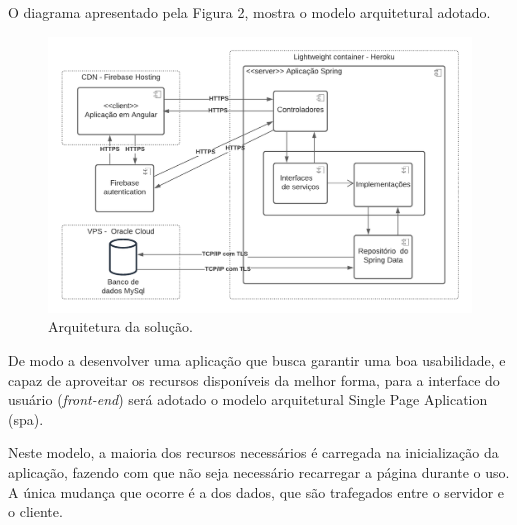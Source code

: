 \documentclass[
    12pt,               %
    openright,          %
    oneside,
    a4paper,            %
    paginasA3,  %
    english,            %
    brazil              %
    ]{ifsp-spo-inf-ctds} %
\begin{document}
O diagrama apresentado pela Figura 2, mostra o modelo arquitetural adotado.

\begin{figure}[htb]
    \centering
	\includegraphics[width=16cm]{imagens/figura2.png}
	\caption{\label{fig_logo} Arquitetura da solução.}
\end{figure}
 
 
De modo a desenvolver uma aplicação que busca garantir uma boa usabilidade, e capaz de aproveitar os recursos disponíveis da melhor forma, para a interface do usuário (\textit{\gls{front-end}}) será adotado o modelo arquitetural Single Page Aplication (\ac{spa}). 


Neste modelo, a maioria dos recursos necessários é carregada na inicialização da aplicação, fazendo com que não seja necessário recarregar a página durante o uso. A única mudança que ocorre é a dos dados, que são trafegados entre o servidor e o cliente.
\end{document}
